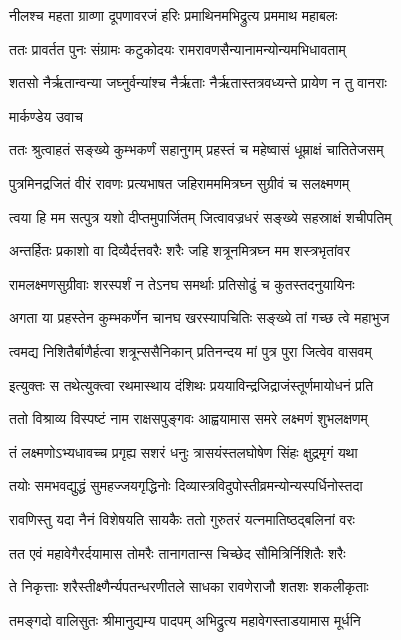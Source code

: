 \twolineshloka
{नीलश्च महता ग्राव्णा दूपणावरजं हरिः}
{प्रमाथिनमभिद्रुत्य प्रममाथ महाबलः}


\twolineshloka
{ततः प्रावर्तत पुनः संग्रामः कटुकोदयः}
{रामरावणसैन्यानामन्योन्यमभिधावताम्}


\twolineshloka
{शतसो नैर्ऋतान्वन्या जघ्नुर्वन्यांश्च नैर्ऋताः}
{नैर्ऋतास्तत्रवध्यन्ते प्रायेण न तु वानराः}


\twolineshloka
{मार्कण्डेय उवाच}
{}


\twolineshloka
{ततः श्रुत्वाहतं सङ्ख्ये कुम्भकर्णं सहानुगम्}
{प्रहस्तं च महेष्वासं धूम्राक्षं चातितेजसम्}


\twolineshloka
{पुत्रमिनद्रजितं वीरं रावणः प्रत्यभाषत}
{जहिरामममित्रघ्न सुग्रीवं च सलक्ष्मणम्}


\twolineshloka
{त्वया हि मम सत्पुत्र यशो दीप्तमुपार्जितम्}
{जित्वावज्रधरं सङ्ख्ये सहस्राक्षं शचीपतिम्}


\twolineshloka
{अन्तर्हितः प्रकाशो वा दिव्यैर्दत्तवरैः शरैः}
{जहि शत्रूनमित्रघ्न मम शस्त्रभृतांवर}


\twolineshloka
{रामलक्ष्मणसुग्रीवाः शरस्पर्शं न तेऽनघ}
{समर्थाः प्रतिसोढुं च कुतस्तदनुयायिनः}


\twolineshloka
{अगता या प्रहस्तेन कुम्भकर्णेन चानघ}
{खरस्यापचितिः सङ्ख्ये तां गच्छ त्वे महाभुज}


\twolineshloka
{त्वमद्य निशितैर्बाणैर्हत्वा शत्रून्ससैनिकान्}
{प्रतिनन्दय मां पुत्र पुरा जित्वेव वासवम्}


\twolineshloka
{इत्युक्तः स तथेत्युक्त्वा रथमास्थाय दंशिथः}
{प्रययाविन्द्रजिद्राजंस्तूर्णमायोधनं प्रति}


\twolineshloka
{ततो विश्राव्य विस्पष्टं नाम राक्षसपुङ्गवः}
{आह्वयामास समरे लक्ष्मणं शुभलक्षणम्}


\twolineshloka
{तं लक्ष्मणोऽभ्यधावच्च प्रगृह्य सशरं धनुः}
{त्रासयंस्तलघोषेण सिंहः क्षुद्रमृगं यथा}


\twolineshloka
{तयोः समभवद्युद्धं सुमहज्जयगृद्धिनोः}
{दिव्यास्त्रविदुपोस्तीव्रमन्योन्यस्पर्धिनोस्तदा}


\twolineshloka
{रावणिस्तु यदा नैनं विशेषयति सायकैः}
{ततो गुरुतरं यत्नमातिष्ठद्बलिनां वरः}


\twolineshloka
{तत एवं महावेगैरर्दयामास तोमरैः}
{तानागतान्स चिच्छेद सौमित्रिर्निशितैः शरैः}


\twolineshloka
{ते निकृत्ताः शरैस्तीक्ष्णैर्न्यपतन्धरणीतले}
{साधका रावणेराजौ शतशः शकलीकृताः}


\twolineshloka
{तमङ्गदो वालिसुतः श्रीमानुद्यम्य पादपम्}
{अभिद्रुत्य महावेगस्ताडयामास मूर्धनि}


